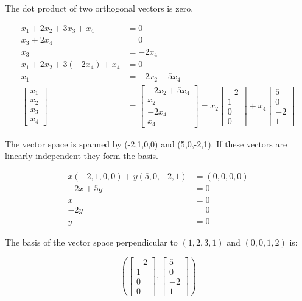 \documentclass[main.tex]{subfiles}
\begin{document}
\begin{enumerate}
\begin{enumerate}
    The dot product of two orthogonal vectors is zero.

    $$
    \begin{aligned}
    x_1 + 2x_2 + 3x_3 + x_4 &= 0\\
    x_3 + 2x_4 &= 0\\
    x_3 &= -2x_4\\
    x_1 + 2x_2 + 3(-2x_4) + x_4 &= 0\\
    x_1 &= -2x_2 + 5x_4\\
    \left[\begin{array}{l}
    x_1 \\
    x_2 \\
    x_3 \\
    x_4
    \end{array}\right] & = \left[\begin{array}{l}
    -2x_2 + 5x_4 \\
    x_2 \\
    -2x_4 \\
    x_4
    \end{array}\right] = x_2\left[\begin{array}{l}
    -2 \\
    1 \\
    0 \\
    0
    \end{array}\right] + x_4\left[\begin{array}{l}
    5 \\
    0 \\
    -2 \\
    1
    \end{array}\right]
    \end{aligned}
    $$

    The vector space is spanned by (-2,1,0,0) and (5,0,-2,1). If these vectors are linearly independent they form the basis.

    $$
    \begin{aligned}
    x(-2,1,0,0) + y(5,0,-2,1) & = (0,0,0,0)\\
    -2x + 5y & = 0\\
    x &= 0\\
    -2y &= 0 \\
    y & = 0
    \end{aligned}
    $$

    The basis of the vector space perpendicular to $(1,2,3,1)$ and $(0,0,1,2)$ is:
    
    $$
    \left(\left[\begin{array}{c}
    -2 \\
    1 \\
    0 \\
    0
    \end{array}\right],\left[\begin{array}{c}
    5 \\
    0 \\
    -2 \\
    1
    \end{array}\right]\right)
    $$
    

\end{enumerate}
\end{enumerate}
\end{document}
